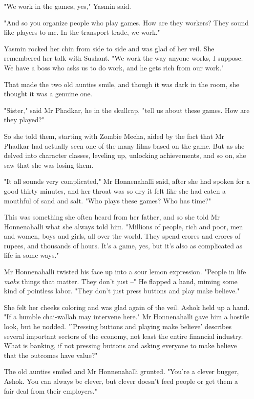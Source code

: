 "We work in the games, yes," Yasmin said.

"And so you organize people who play games. How are they workers?
They sound like players to me. In the transport trade, we work."

Yasmin rocked her chin from side to side and was glad of her veil.
She remembered her talk with Sushant. "We work the way anyone
works, I suppose. We have a boss who asks us to do work, and he
gets rich from our work."

That made the two old aunties smile, and though it was dark in the
room, she thought it was a genuine one.

"Sister," said Mr Phadkar, he in the skullcap, "tell us about these
games. How are they played?"

So she told them, starting with Zombie Mecha, aided by the fact
that Mr Phadkar had actually seen one of the many films based on
the game. But as she delved into character classes, leveling up,
unlocking achievements, and so on, she saw that she was losing
them.

"It all sounds very complicated," Mr Honnenahalli said, after she
had spoken for a good thirty minutes, and her throat was so dry it
felt like she had eaten a mouthful of sand and salt. "Who plays
these games? Who has time?"

This was something she often heard from her father, and so she told
Mr Honnenahalli what she always told him. "Millions of people, rich
and poor, men and women, boys and girls, all over the world. They
spend crores and crores of rupees, and thousands of hours. It's a
game, yes, but it's also as complicated as life in some ways."

Mr Honnenahalli twisted his face up into a sour lemon expression.
"People in life \emph{make} things that matter. They don't just --"
He flapped a hand, miming some kind of pointless labor. "They don't
just press buttons and play make believe."

She felt her cheeks coloring and was glad again of the veil. Ashok
held up a hand. "If a humble chai-wallah may intervene here." Mr
Honnenahalli gave him a hostile look, but he nodded. "'Pressing
buttons and playing make believe' describes several important
sectors of the economy, not least the entire financial industry.
What is banking, if not pressing buttons and asking everyone to
make believe that the outcomes have value?"

The old aunties smiled and Mr Honnenahalli grunted. "You're a
clever bugger, Ashok. You can always be clever, but clever doesn't
feed people or get them a fair deal from their employers."

